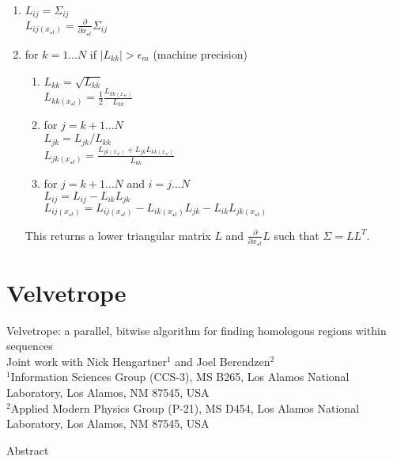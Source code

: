 \documentclass[phd,tocprelim]{cornell}
\begin{document}
\begin{enumerate}
 \item $L_{ij} = \Sigma_{ij}$ \\
       $L_{ij (x_{\star t})} = \frac{\partial}{\partial x_{\star t}} \Sigma_{ij}$
 \item for $k = 1\ldots N$ if $|L_{kk}| > \epsilon_{m}$ (machine precision)
 \begin{enumerate}
  \item $L_{kk} = \sqrt{L_{kk}}$ \\
	$L_{kk (x_{\star t})} = \frac{1}{2} \frac{L_{kk (x_{\star t})}}{L_{kk}}$
  \item for $j = k+1\ldots N$ \\
	$L_{jk} = L_{jk}/L_{kk}$ \\
	$L_{jk (x_{\star t})} = \frac{L_{jk (x_{\star t})} + L_{jk}L_{kk (x_{\star t})}}{L_{kk}}$
  \item for $j = k+1\ldots N$ and $i = j\ldots N$ \\
	$L_{ij} = L_{ij} - L_{ik}L_{jk}$ \\
	$L_{ij (x_{\star t})} = L_{ij (x_{\star t})} - L_{ik (x_{\star t})}L_{jk} - L_{ik}L_{jk (x_{\star t})}$
 \end{enumerate}

This returns a lower triangular matrix $L$ and $\frac{\partial}{\partial x_{\star t}} L$ such that $\Sigma = LL^{T}$.

\end{enumerate}




\part{Velvetrope} %
\label{prt:Velvetrope}

\noindent
\Large
Velvetrope: a parallel, bitwise algorithm for finding homologous regions within sequences \\
\normalsize
Joint work with Nick Hengartner$^{1}$ and Joel Berendzen$^{2}$ \\
\scriptsize
$^{1}$Information Sciences Group (CCS-3), MS B265, Los Alamos National
 Laboratory, Los Alamos, NM 87545, USA \\
$^{2}$Applied Modern Physics Group (P-21), MS D454, Los Alamos National
 Laboratory, Los Alamos, NM 87545, USA
\normalsize

\begin{center}
   Abstract 
\end{center}
\end{document}

